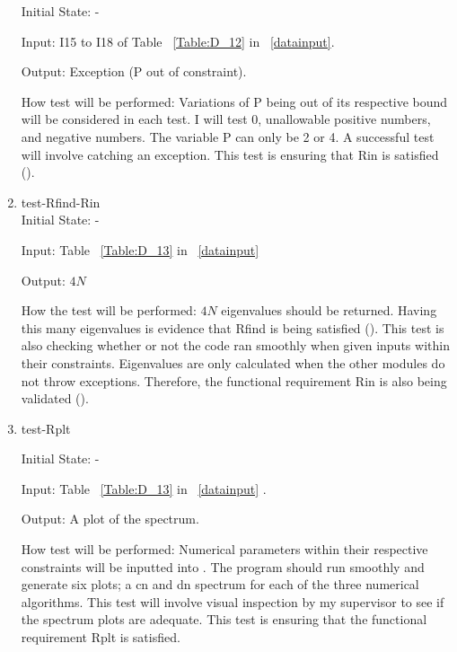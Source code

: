 \documentclass[12pt, titlepage]{article}
\begin{document}
\begin{enumerate}
Initial State: -

Input: I15 to I18 of Table ~\ref{Table:D_12} in ~\ref{datainput}.

Output: Exception (P out of constraint).

How test will be performed: Variations of P being out of its respective bound 
will be considered in each test. I will test 0, unallowable positive numbers, 
and negative numbers. The variable P 
can only be 2 or 4. A successful test will involve catching an exception. This 
test is ensuring that Rin is satisfied (\cite{SRS}). \\
					
\item{test-Rfind-Rin\\} 
\label{Rfind}
Initial State: - 

Input: Table ~\ref{Table:D_13} in ~\ref{datainput}

Output: $4N$

How the test will be performed: $4N$ eigenvalues should be returned. Having 
this many eigenvalues is evidence that Rfind is being satisfied (\cite{SRS}). 
This 
test is also checking whether or not the code ran smoothly when given inputs 
within their constraints. Eigenvalues are only calculated when the other 
modules do not throw exceptions. Therefore, the functional requirement Rin is 
also being validated (\cite{SRS}). \\

\item{test-Rplt} 

Initial State: -

Input: Table ~\ref{Table:D_13} in ~\ref{datainput} .

Output: A plot of the spectrum.

How test will be performed: Numerical parameters within their respective 
constraints will be inputted into \progname. The program should run smoothly 
and generate six plots; a cn and dn spectrum for each of the three numerical 
algorithms. This test will involve visual 
inspection by my supervisor to see if the spectrum plots are adequate. This 
test is ensuring that the functional requirement Rplt is satisfied.  \\
 

\end{enumerate}
\end{document}
